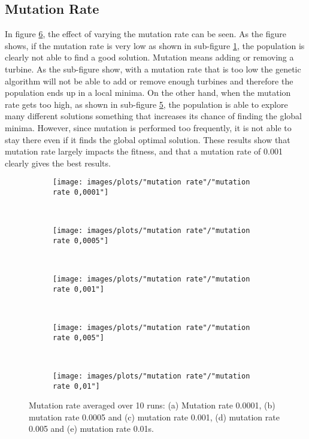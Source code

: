 \subsection{Mutation Rate}
In figure \ref{plot:mutation rate}, the effect of varying the mutation rate can be seen. As the figure shows, if the mutation rate is very low as shown in sub-figure \ref{plot:mutation rate 0.0001}, the population is clearly not able to find a good solution. Mutation means adding or removing a turbine. As the sub-figure show, with a mutation rate that is too low the genetic algorithm will not be able to add or remove enough turbines and therefore the population ends up in a local minima. On the other hand, when the mutation rate gets too high, as shown in sub-figure \ref{plot:mutation rate 0.01}, the population is able to explore many different solutions something that increases its chance of finding the global minima. However, since mutation is performed too frequently, it is not able to stay there even if it finds the global optimal solution. These results show that mutation rate largely impacts the fitness, and that a mutation rate of 0.001 clearly gives the best results.


\begin{figure}[h!]
    \centering
      \begin{subfigure}[b]{0.31\textwidth}
        \texttt{[image: images/plots/"mutation rate"/"mutation rate 0,0001"]}
        \caption{}
        \hfill
        \label{plot:mutation rate 0.0001}
    \end{subfigure}
    ~
      \begin{subfigure}[b]{0.31\textwidth}
        \texttt{[image: images/plots/"mutation rate"/"mutation rate 0,0005"]}
        \caption{}
        \hfill
        \label{plot:mutation rate 0.0005}
    \end{subfigure}
    ~
    \begin{subfigure}[b]{0.31\textwidth}
        \texttt{[image: images/plots/"mutation rate"/"mutation rate 0,001"]}
        \caption{}
        \hfill
        \label{plot:mutation rate 0.001}
    \end{subfigure}
    ~
    \begin{subfigure}[b]{0.31\textwidth}
        \texttt{[image: images/plots/"mutation rate"/"mutation rate 0,005"]}
        \caption{}
        \hfill
        \label{plot:mutation rate 0.005}
    \end{subfigure}
    ~
    \begin{subfigure}[b]{0.31\textwidth}
        \texttt{[image: images/plots/"mutation rate"/"mutation rate 0,01"]}
        \caption{}
        \hfill
        \label{plot:mutation rate 0.01}
    \end{subfigure}
    \caption{Mutation rate averaged over 10 runs: (a) Mutation rate 0.0001, (b) mutation rate 0.0005 and (c) mutation rate 0.001, (d) mutation rate 0.005 and (e) mutation rate 0.01s.}
    \label{plot:mutation rate}
\end{figure}


